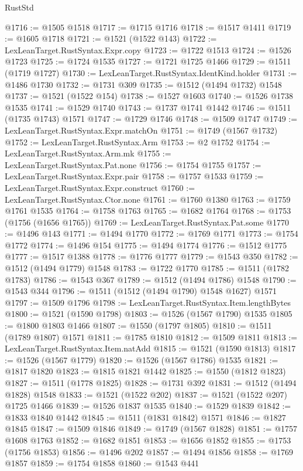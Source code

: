 \begin{lexlean}{RustStd}
\begin{coremodule}
{{@1716 := @1505 @1518
@1717 := @1715 @1716
@1718 := @1517 @1411
@1719 := @1605 @1718
@1721 := @1521 (@1522 @143)
@1722 := LexLeanTarget.RustSyntax.Expr.copy
@1723 := @1722 @1513
@1724 := @1526 @1723
@1725 := @1724 @1535
@1727 := @1721 @1725 @1466
@1729 := @1511 (@1719 @1727)
@1730 := LexLeanTarget.RustSyntax.IdentKind.holder
@1731 := @1486 @1730
@1732 := @1731 @309
@1735 := @1512 (@1494 @1732) @1548
@1737 := @1521 (@1522 @154)
@1738 := @1527 @1603
@1740 := @1526 @1738 @1535
@1741 := @1529 @1740
@1743 := @1737 @1741 @1442
@1746 := @1511 (@1735 @1743) @1571
@1747 := @1729 @1746
@1748 := @1509 @1747
@1749 := LexLeanTarget.RustSyntax.Expr.matchOn
@1751 := @1749 (@1567 @1732)
@1752 := LexLeanTarget.RustSyntax.Arm
@1753 := @2 @1752
@1754 := LexLeanTarget.RustSyntax.Arm.mk
@1755 := LexLeanTarget.RustSyntax.Pat.none
@1756 := @1754 @1755
@1757 := LexLeanTarget.RustSyntax.Expr.pair
@1758 := @1757 @1533
@1759 := LexLeanTarget.RustSyntax.Expr.construct
@1760 := LexLeanTarget.RustSyntax.Ctor.none
@1761 := @1760 @1380
@1763 := @1759 @1761 @1535
@1764 := @1758 @1763
@1765 := @1682 @1764
@1768 := @1753 (@1756 (@1656 @1765))
@1769 := LexLeanTarget.RustSyntax.Pat.some
@1770 := @1496 @143
@1771 := @1494 @1770
@1772 := @1769 @1771
@1773 := @1754 @1772
@1774 := @1496 @154
@1775 := @1494 @1774
@1776 := @1512 @1775
@1777 := @1517 @1388
@1778 := @1776 @1777
@1779 := @1543 @350
@1782 := @1512 (@1494 @1779) @1548
@1783 := @1722 @1770
@1785 := @1511 (@1782 @1783)
@1786 := @1543 @367
@1789 := @1512 (@1494 @1786) @1548
@1790 := @1543 @344
@1796 := @1511 (@1512 (@1494 @1790) @1548 @1627) @1571
@1797 := @1509 @1796
@1798 := LexLeanTarget.RustSyntax.Item.lengthBytes
@1800 := @1521 (@1590 @1798)
@1803 := @1526 (@1567 @1790) @1535
@1805 := @1800 @1803 @1466
@1807 := @1550 (@1797 @1805)
@1810 := @1511 (@1789 @1807) @1571
@1811 := @1785 @1810
@1812 := @1509 @1811
@1813 := LexLeanTarget.RustSyntax.Item.natAdd
@1815 := @1521 (@1590 @1813)
@1817 := @1526 (@1567 @1779)
@1820 := @1526 (@1567 @1786) @1535
@1821 := @1817 @1820
@1823 := @1815 @1821 @1442
@1825 := @1550 (@1812 @1823)
@1827 := @1511 (@1778 @1825)
@1828 := @1731 @392
@1831 := @1512 (@1494 @1828) @1548
@1833 := @1521 (@1522 @202)
@1837 := @1521 (@1522 @207) @1725 @1466
@1839 := @1526 @1837 @1535
@1840 := @1529 @1839
@1842 := @1833 @1840 @1442
@1845 := @1511 (@1831 @1842) @1571
@1846 := @1827 @1845
@1847 := @1509 @1846
@1849 := @1749 (@1567 @1828)
@1851 := @1757 @1608 @1763
@1852 := @1682 @1851
@1853 := @1656 @1852
@1855 := @1753 (@1756 @1853)
@1856 := @1496 @202
@1857 := @1494 @1856
@1858 := @1769 @1857
@1859 := @1754 @1858
@1860 := @1543 @441
}}
\end{coremodule}
\end{lexlean}
